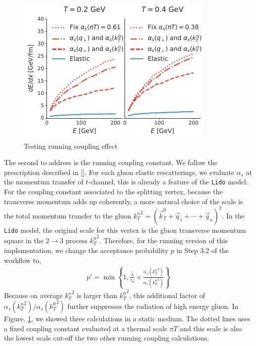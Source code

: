 \documentclass[aps, prc, reprint, amsmath, groupedaddress, nofootinbib]{revtex4-1}
\begin{document}
\begin{figure}
\includegraphics[width=\columnwidth]{Eloss_infinite_run.pdf}
\caption{Testing running coupling effect }
\label{fig:run}
\end{figure}
The second to address is the running coupling constant. We follow the prescription described in []. 
For each gluon elastic rescatterings, we evaluate $\alpha_s$ at the momentum transfer of $t$-channel, this is already a feature of the {\tt Lido} model.
For the coupling constant associated to the splitting vertex, because the transverse momentum adds up coherently, a more natural choice of the scale is the total momentum transfer to the gluon ${k_T^n}^2 = \left(\vec{k}_T^0+\vec{q}_1+\cdots+\vec{q}_n\right)^2$.
In the {\tt Lido} model, the original scale for this vertex is the gluon transverse momentum square in the $2\rightarrow 3$ process ${k_T^0}^2$.
Therefore, for the running version of this implementation, we change the acceptance probability $p$ in Step 3.2 of the workflow to,
\begin{eqnarray}
p' = \min\left\{1, \frac{\tilde{\lambda}}{\tau_n}\times\frac{\alpha_s({k_T^n}^2)}{\alpha_s({k_T^0}^2)}\right\}
\end{eqnarray}
Because on average ${k_T^n}^2$ is larger than ${k_T^0}^2$, this additional factor of $\alpha_s({k_T^n}^2)/\alpha_s({k_T^0}^2)$ further suppresses the radiation of high energy gluon.
In Figure. \ref{fig:run}, we showed three calculations in a static medium. The dotted lines uses a fixed coupling constant evaluated at a thermal scale $\pi T$ and this scale is also the lowest scale cut-off the two other running coupling calculations.
\end{document}
